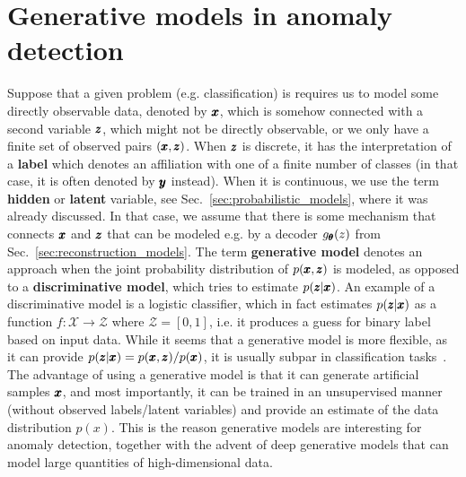 \chapter{Generative models in anomaly detection} \label{sec:chapter_survey}
Suppose that a given problem (e.g. classification) is requires us to model some directly observable data, denoted by $\pmb{{x}}$, which is somehow connected with a second variable $\pmb{{z}}$, which might not be directly observable, or we only have a finite set of observed pairs $(\pmb{{x}},\pmb{{z}})$. When $\pmb{{z}}$ is discrete, it has the interpretation of a \textbf{label} which denotes an affiliation with one of a finite number of classes (in that case, it is often denoted by $\pmb{{y}}$ instead). When it is continuous, we use the term \textbf{hidden} or \textbf{latent} variable, see Sec.~\ref{sec:probabilistic_models}, where it was already discussed. In that case, we assume that there is some mechanism that connects $\pmb{{x}}$ and $\pmb{{z}}$ that can be modeled e.g. by a decoder $g_{\pmb{{\theta}}}(z)$ from Sec.~\ref{sec:reconstruction_models}. The term \textbf{generative model} denotes an approach when the joint probability distribution of $p(\pmb{{x}},\pmb{{z}})$ is modeled, as opposed to a \textbf{discriminative model}, which tries to estimate $p(\pmb{{z}} \vert \pmb{{x}})$. An example of a discriminative model is a logistic classifier, which in fact estimates $p(\pmb{{z}} \vert \pmb{{x}})$ as a function $f:\mathcal{X} \rightarrow \mathcal{Z}$ where $\mathcal{Z} = [0,1]$, i.e. it produces a guess for binary label based on input data. While it seems that a generative model is more flexible, as it can provide  $p(\pmb{{z}} \vert \pmb{{x}}) = p(\pmb{{x}},\pmb{{z}})/p(\pmb{{x}})$, it is usually subpar in classification tasks~\cite{ng2001discriminative,bishop2007generative}. The advantage of using a generative model is that it can generate artificial samples $\pmb{{x}}$, and most importantly, it can be trained in an unsupervised manner (without observed labels/latent variables) and provide an estimate of the data distribution $p(x)$. This is the reason generative models are interesting for anomaly detection, together with the advent of deep generative models that can model large quantities of high-dimensional data.

